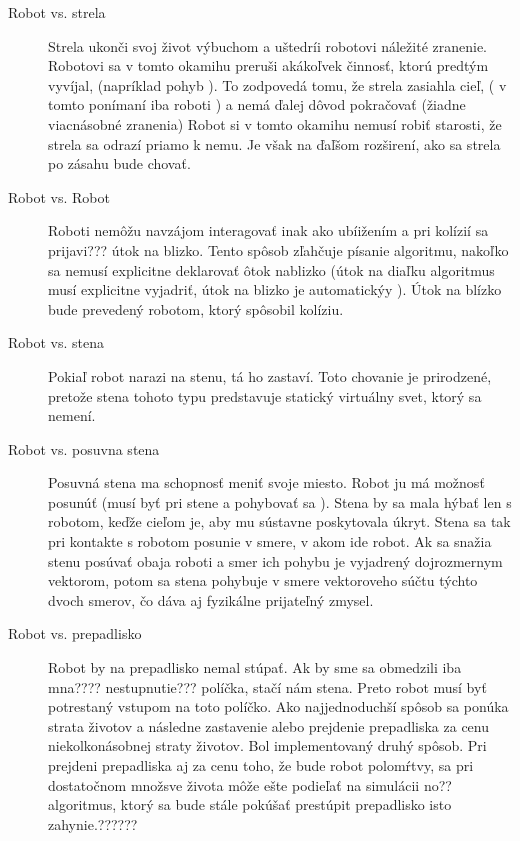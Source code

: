 \begin{description}
\item [Robot vs. strela] Strela ukonči svoj život výbuchom a uštedríi robotovi náležité zranenie. Robotovi sa v tomto okamihu preruši akákoľvek činnosť, ktorú predtým vyvíjal,  (napríklad pohyb ). To zodpovedá tomu, že strela zasiahla cieľ,  ( v tomto ponímaní iba roboti ) a nemá ďalej dôvod pokračovať (žiadne viacnásobné zranenia) %
Robot si v tomto okamihu nemusí robiť starosti, že strela sa odrazí priamo k nemu. Je však na ďaľšom rozširení, ako sa strela po zásahu bude chovať.
\item [Robot vs. Robot] Roboti nemôžu navzájom interagovať inak ako ubíižením a pri kolízií sa prijavi??? útok na blizko. Tento spôsob zľahčuje písanie algoritmu, nakoľko sa nemusí explicitne deklarovať ôtok nablizko  (útok na diaľku algoritmus musí explicitne vyjadriť, útok na blizko je automatickýy ). Útok na blízko bude prevedený robotom, ktorý spôsobil kolíziu. %
\item [Robot vs. stena] Pokiaľ robot narazi na stenu, tá ho zastaví. Toto chovanie je prirodzené, pretože stena tohoto typu predstavuje statický virtuálny svet, ktorý sa nemení.%
\item [Robot vs. posuvna stena ] Posuvná stena ma schopnosť meniť svoje miesto. Robot ju má možnosť  posunúť  (musí byť pri stene a pohybovať sa ). Stena by sa mala hýbať len s robotom, keďže cieľom je, aby mu sústavne poskytovala úkryt. Stena sa tak pri kontakte s robotom posunie v smere, v akom ide robot. Ak sa snažia stenu posúvať obaja roboti a smer ich pohybu je vyjadrený dojrozmernym vektorom, potom sa stena pohybuje v smere vektoroveho súčtu týchto dvoch smerov, čo dáva aj fyzikálne prijateľný  zmysel.
\item[Robot vs. prepadlisko] Robot by na prepadlisko nemal stúpať. Ak by sme sa obmedzili iba mna???? nestupnutie??? políčka, stačí  nám stena. Preto robot musí byť potrestaný vstupom na toto políčko. Ako najjednoduchší spôsob sa ponúka strata životov a následne zastavenie alebo prejdenie prepadliska za cenu niekolkonásobnej straty životov. Bol implementovaný druhý spôsob. Pri prejdeni prepadliska aj za cenu toho, že bude robot polomŕtvy, sa pri dostatočnom množsve života môže ešte podieľať na simulácii no?? algoritmus, ktorý sa bude stále pokúšať  prestúpit prepadlisko isto zahynie.??????

\end{description}
